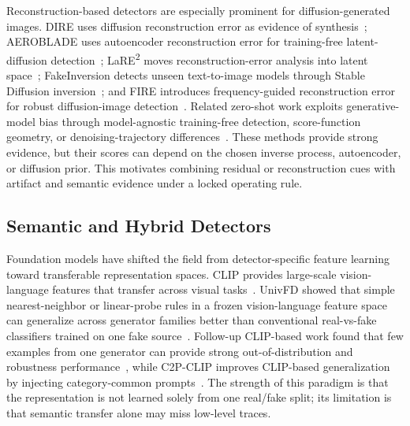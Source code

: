 \documentclass[lettersize,journal]{IEEEtran}
\begin{document}
Reconstruction-based detectors are especially prominent for diffusion-generated images. DIRE uses diffusion reconstruction error as evidence of synthesis~\cite{wang2023dire}; AEROBLADE uses autoencoder reconstruction error for training-free latent-diffusion detection~\cite{ricker2024aeroblade}; LaRE\textsuperscript{2} moves reconstruction-error analysis into latent space~\cite{luo2024lare2}; FakeInversion detects unseen text-to-image models through Stable Diffusion inversion~\cite{cazenavette2024fakeinversion}; and FIRE introduces frequency-guided reconstruction error for robust diffusion-image detection~\cite{chu2025fire}. Related zero-shot work exploits generative-model bias through model-agnostic training-free detection, score-function geometry, or denoising-trajectory differences~\cite{he2024rigid,brokman2025manifold,liang2025trajectory}. These methods provide strong evidence, but their scores can depend on the chosen inverse process, autoencoder, or diffusion prior. This motivates combining residual or reconstruction cues with artifact and semantic evidence under a locked operating rule.

\subsection{Semantic and Hybrid Detectors}
Foundation models have shifted the field from detector-specific feature learning toward transferable representation spaces. CLIP provides large-scale vision-language features that transfer across visual tasks~\cite{radford2021clip}. UnivFD showed that simple nearest-neighbor or linear-probe rules in a frozen vision-language feature space can generalize across generator families better than conventional real-vs-fake classifiers trained on one fake source~\cite{ojha2023univfd}. Follow-up CLIP-based work found that few examples from one generator can provide strong out-of-distribution and robustness performance~\cite{cozzolino2024clip}, while C2P-CLIP improves CLIP-based generalization by injecting category-common prompts~\cite{tan2025c2pclip}. The strength of this paradigm is that the representation is not learned solely from one real/fake split; its limitation is that semantic transfer alone may miss low-level traces.
\end{document}
